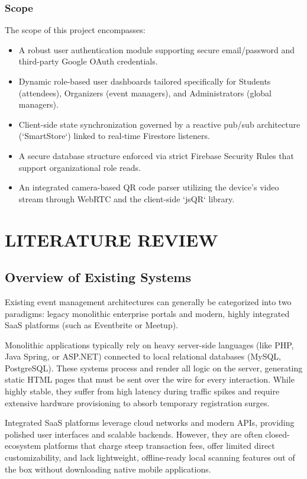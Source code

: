 \documentclass[14pt,a4paper]{extreport}
\begin{document}
\subsection{Scope}
The scope of this project encompasses:
\begin{itemize}
    \item A robust user authentication module supporting secure email/password and third-party Google OAuth credentials.
    \item Dynamic role-based user dashboards tailored specifically for Students (attendees), Organizers (event managers), and Administrators (global managers).
    \item Client-side state synchronization governed by a reactive pub/sub architecture (`SmartStore`) linked to real-time Firestore listeners.
    \item A secure database structure enforced via strict Firebase Security Rules that support organizational role reads.
    \item An integrated camera-based QR code parser utilizing the device's video stream through WebRTC and the client-side `jsQR` library.
\end{itemize}

\chapter{LITERATURE REVIEW}
\section{Overview of Existing Systems}
Existing event management architectures can generally be categorized into two paradigms: legacy monolithic enterprise portals and modern, highly integrated SaaS platforms (such as Eventbrite or Meetup). 

Monolithic applications typically rely on heavy server-side languages (like PHP, Java Spring, or ASP.NET) connected to local relational databases (MySQL, PostgreSQL). These systems process and render all logic on the server, generating static HTML pages that must be sent over the wire for every interaction. While highly stable, they suffer from high latency during traffic spikes and require extensive hardware provisioning to absorb temporary registration surges.

Integrated SaaS platforms leverage cloud networks and modern APIs, providing polished user interfaces and scalable backends. However, they are often closed-ecosystem platforms that charge steep transaction fees, offer limited direct customizability, and lack lightweight, offline-ready local scanning features out of the box without downloading native mobile applications.
\end{document}
